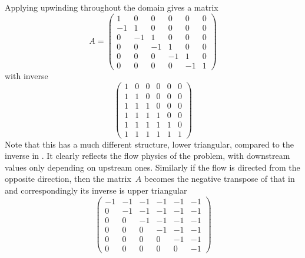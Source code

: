Applying upwinding throughout the domain gives a matrix
\begin{equation}\label{eq:mat3}
A=\begin{pmatrix}
1 & 0 & 0 & 0 & 0 & 0\\
-1 & 1 & 0 & 0 & 0 & 0\\
0 & -1 & 1 & 0 & 0 & 0 \\
0 & 0 & -1 & 1 & 0 & 0\\
0 & 0 & 0 & -1 & 1 & 0\\
0 & 0 & 0 & 0 & -1 & 1
\end{pmatrix}
\end{equation}
with inverse
\begin{equation}\label{eq:mat4}
\begin{pmatrix}
1 & 0 & 0 & 0 & 0 & 0\\
1 & 1 & 0 & 0 & 0 & 0\\
1 & 1 & 1 & 0 & 0 & 0 \\
1 & 1 & 1 & 1 & 0 & 0\\
1 & 1 & 1 & 1 & 1 & 0\\
1 & 1 & 1 & 1 & 1 & 1
\end{pmatrix}
\end{equation}
Note that this has a much different structure, lower triangular, compared to the inverse in .
It clearly reflects the flow physics of the problem, with downstream values only
depending on upstream ones. Similarly if the flow is directed from the opposite direction,
then the matrix~$A$ becomes the negative transpose of that in  and
correspondingly its inverse is upper triangular
\begin{equation}\label{eq:mat5}
\begin{pmatrix}
-1 & -1 & -1 & -1 & -1 & -1\\
0 & -1 & -1 & -1 & -1 & -1\\
0 & 0 & -1 & -1 & -1 & -1\\
0 & 0 & 0 & -1 & -1 & -1\\
0 & 0 & 0 & 0 & -1 & -1\\
0 & 0 & 0 & 0 & 0 & -1
\end{pmatrix}
\end{equation}


